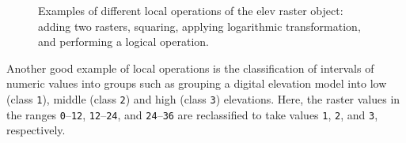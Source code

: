 \documentclass[
  letterpaper,
]{krantz}
\begin{document}
\begin{figure}

\begin{minipage}{0.25\linewidth}



\end{minipage}%
%
\begin{minipage}{0.25\linewidth}



\end{minipage}%
%
\begin{minipage}{0.25\linewidth}



\end{minipage}%
%
\begin{minipage}{0.25\linewidth}



\end{minipage}%

\caption{\label{fig-raster-local-operations}Examples of different local
operations of the elev raster object: adding two rasters, squaring,
applying logarithmic transformation, and performing a logical
operation.}

\end{figure}%

Another good example of local operations is the classification of
intervals of numeric values into groups such as grouping a digital
elevation model into low (class \texttt{1}), middle (class \texttt{2})
and high (class \texttt{3}) elevations. Here, the raster values in the
ranges \texttt{0}--\texttt{12}, \texttt{12}--\texttt{24}, and
\texttt{24}--\texttt{36} are reclassified to take values \texttt{1},
\texttt{2}, and \texttt{3}, respectively.
\end{document}

